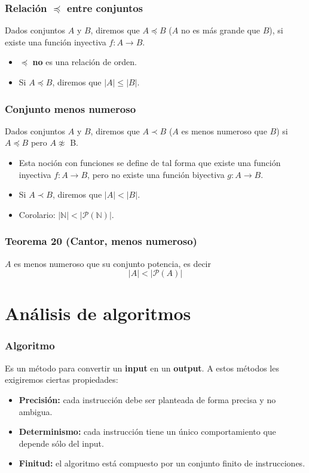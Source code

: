 \begin{multicols}{2}
    \subsubsection*{Relación $\preceq$ entre conjuntos}
    Dados conjuntos $A$ y $B$, diremos que $A \preceq B$ ($A$ no es más grande que $B$), si existe una función inyectiva $f: A \rightarrow B$.
    \begin{itemize}
        \item $\preceq$ \textbf{no} es una relación de orden.
        \item Si $A \preceq B$, diremos que $|A| \leq |B|$.
    \end{itemize}
    
    \subsubsection*{Conjunto menos numeroso}
    Dados conjuntos $A$ y $B$, diremos que $A \prec B$ ($A$ es menos numeroso que $B$) si $A \preceq B$ pero $A \not\approx$ B.
    \begin{itemize}
        \item Esta noción con funciones se define de tal forma que existe una función inyectiva $f: A \rightarrow B$, pero no existe una función biyectiva $g: A \rightarrow B$.
        \item Si $A \prec B$, diremos que $|A| < |B|$.
        \item Corolario: $|\mathbb{N}| < |\mathcal{P}(\mathbb{N})|$.
    \end{itemize}
    
    \subsubsection*{Teorema 20 (Cantor, menos numeroso)}
    $A$ es menos numeroso que su conjunto potencia, es decir
    $$
    |A| < |\mathcal{P}(A)|
    $$
    
    \section{Análisis de algoritmos}
    
    \subsubsection*{Algoritmo}
    Es un método para convertir un \textbf{input} en un \textbf{output}. A estos métodos les exigiremos ciertas propiedades:
    \begin{itemize}
        \item \textbf{Precisión:} cada instrucción debe ser planteada de forma precisa y no ambigua.
        \item \textbf{Determinismo:} cada instrucción tiene un único comportamiento que depende sólo del input.
        \item \textbf{Finitud:} el algoritmo está compuesto por un conjunto finito de instrucciones.
    \end{itemize}
    

\end{multicols}
